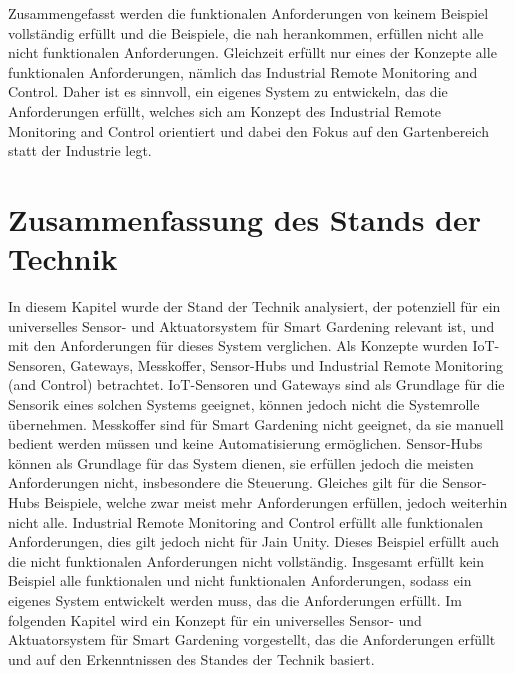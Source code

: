 Zusammengefasst werden die funktionalen Anforderungen von keinem Beispiel vollständig erfüllt und die Beispiele, die nah herankommen, erfüllen nicht alle nicht funktionalen Anforderungen.
Gleichzeit erfüllt nur eines der Konzepte alle funktionalen Anforderungen, nämlich das Industrial Remote Monitoring and Control.
Daher ist es sinnvoll, ein eigenes System zu entwickeln, das die Anforderungen erfüllt, welches sich am Konzept des Industrial Remote Monitoring and Control orientiert und dabei den Fokus auf den Gartenbereich statt der Industrie legt.


\section{Zusammenfassung des Stands der Technik}
In diesem Kapitel wurde der Stand der Technik analysiert, der potenziell für ein universelles Sensor- und Aktuatorsystem für Smart Gardening relevant ist, und mit den Anforderungen für dieses System verglichen.
Als Konzepte wurden IoT-Sensoren, Gateways, Messkoffer, Sensor-Hubs und Industrial Remote Monitoring (and Control) betrachtet.
IoT-Sensoren und Gateways sind als Grundlage für die Sensorik eines solchen Systems geeignet, können jedoch nicht die Systemrolle übernehmen.
Messkoffer sind für Smart Gardening nicht geeignet, da sie manuell bedient werden müssen und keine Automatisierung ermöglichen.
Sensor-Hubs können als Grundlage für das System dienen, sie erfüllen jedoch die meisten Anforderungen nicht, insbesondere die Steuerung.
Gleiches gilt für die Sensor-Hubs Beispiele, welche zwar meist mehr Anforderungen erfüllen, jedoch weiterhin nicht alle.
Industrial Remote Monitoring and Control erfüllt alle funktionalen Anforderungen, dies gilt jedoch nicht für Jain Unity.
Dieses Beispiel erfüllt auch die nicht funktionalen Anforderungen nicht vollständig.
Insgesamt erfüllt kein Beispiel alle funktionalen und nicht funktionalen Anforderungen, sodass ein eigenes System entwickelt werden muss, das die Anforderungen erfüllt.
Im folgenden Kapitel wird ein Konzept für ein universelles Sensor- und Aktuatorsystem für Smart Gardening vorgestellt, das die Anforderungen erfüllt und auf den Erkenntnissen des Standes der Technik basiert.